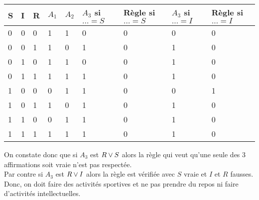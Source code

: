 \documentclass[11pt,a4paper]{article}
\begin{document}
\begin{Exercise}[title = {Logique et calcul des propositions}, origin = {\bac \; {\sc ccp 2015}}]
{\begin{tabular}{|l|l|l|l|l|l|l|l|l|}
			\hline
			S & I & R & $A_1$ & $A_2$ & $A_3$ si $\dots = S$ & Règle si $\dots = S$ & $A_3$ si $\dots = I$ & Règle si $\dots = I$ \\
			\hline
			0 & 0 & 0 & 1     & 1     & 0                    & 0                    & 0                    & 0                    \\
			\hline
			0 & 0 & 1 & 1     & 0     & 1                    & 0                    & 1                    & 0                    \\
			\hline
			0 & 1 & 0 & 1     & 1     & 0                    & 0                    & 1                    & 0                    \\
			\hline
			0 & 1 & 1 & 1     & 1     & 1                    & 0                    & 1                    & 0                    \\
			\hline
			1 & 0 & 0 & 0     & 1     & 1                    & 0                    & 0                    & 1                    \\
			\hline
			1 & 0 & 1 & 1     & 0     & 1                    & 0                    & 1                    & 0                    \\
			\hline
			1 & 1 & 0 & 0     & 1     & 1                    & 0                    & 1                    & 0                    \\
			\hline
			1 & 1 & 1 & 1     & 1     & 1                    & 0                    & 1                    & 0                    \\
			\hline
		\end{tabular}
	On constate donc que si $A_3$ est $R \vee S$ alors la règle qui veut qu'une seule des 3 affirmations soit vraie n'est pas respectée.\\
		Par contre si $A_3$ est $R \vee I$ alors la règle est vérifiée avec $S$ vraie et $I$ et $R$ fausses. Donc, on doit faire des activités sportives et ne pas prendre du repos ni faire d'activités intellectuelles.
	}
\end{Exercise}
\end{document}
